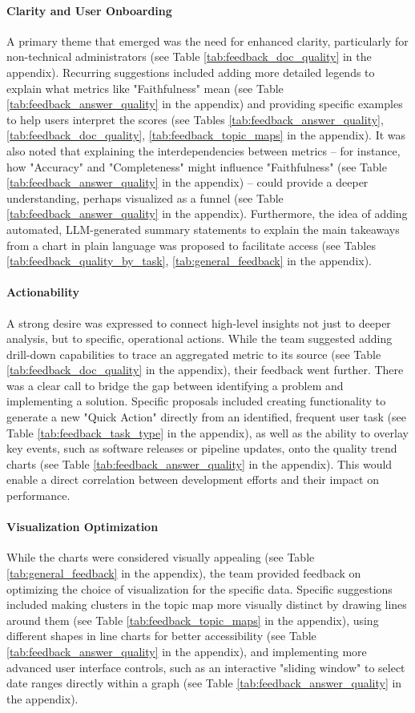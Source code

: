 \documentclass[
	english,
	ruledheaders=section,%
	class=report,%
	thesis={type=bachelor},%
	accentcolor=1b,%
	custommargins=true,%
	marginpar=false,%
	parskip=half-,%
	fontsize=11pt,%
	DIV=14,
]{tudapub}
\begin{document}
\paragraph{Clarity and User Onboarding} A primary theme that emerged was the need for enhanced clarity, particularly for non-technical administrators (see Table \ref{tab:feedback_doc_quality} in the appendix). Recurring suggestions included adding more detailed legends to explain what metrics like "Faithfulness" mean (see Table \ref{tab:feedback_answer_quality} in the appendix) and providing specific examples to help users interpret the scores (see Tables \ref{tab:feedback_answer_quality}, \ref{tab:feedback_doc_quality}, \ref{tab:feedback_topic_maps} in the appendix). It was also noted that explaining the interdependencies between metrics -- for instance, how "Accuracy" and "Completeness" might influence "Faithfulness" (see Table \ref{tab:feedback_answer_quality} in the appendix) -- could provide a deeper understanding, perhaps visualized as a funnel (see Table \ref{tab:feedback_answer_quality} in the appendix). Furthermore, the idea of adding automated, LLM-generated summary statements to explain the main takeaways from a chart in plain language was proposed to facilitate access (see Tables \ref{tab:feedback_quality_by_task}, \ref{tab:general_feedback} in the appendix).
\paragraph{Actionability} A strong desire was expressed to connect high-level insights not just to deeper analysis, but to specific, operational actions. While the team suggested adding drill-down capabilities to trace an aggregated metric to its source (see Table \ref{tab:feedback_doc_quality} in the appendix), their feedback went further. There was a clear call to bridge the gap between identifying a problem and implementing a solution. Specific proposals included creating functionality to generate a new "Quick Action" directly from an identified, frequent user task (see Table  \ref{tab:feedback_task_type} in the appendix), as well as the ability to overlay key events, such as software releases or pipeline updates, onto the quality trend charts (see Table \ref{tab:feedback_answer_quality} in the appendix). This would enable a direct correlation between development efforts and their impact on performance.
\paragraph{Visualization Optimization} While the charts were considered visually appealing (see Table \ref{tab:general_feedback} in the appendix), the team provided feedback on optimizing the choice of visualization for the specific data. Specific suggestions included making clusters in the topic map more visually distinct by drawing lines around them (see Table \ref{tab:feedback_topic_maps} in the appendix), using different shapes in line charts for better accessibility (see Table \ref{tab:feedback_answer_quality} in the appendix), and implementing more advanced user interface controls, such as an interactive "sliding window" to select date ranges directly within a graph (see Table \ref{tab:feedback_answer_quality} in the appendix).
\end{document}
